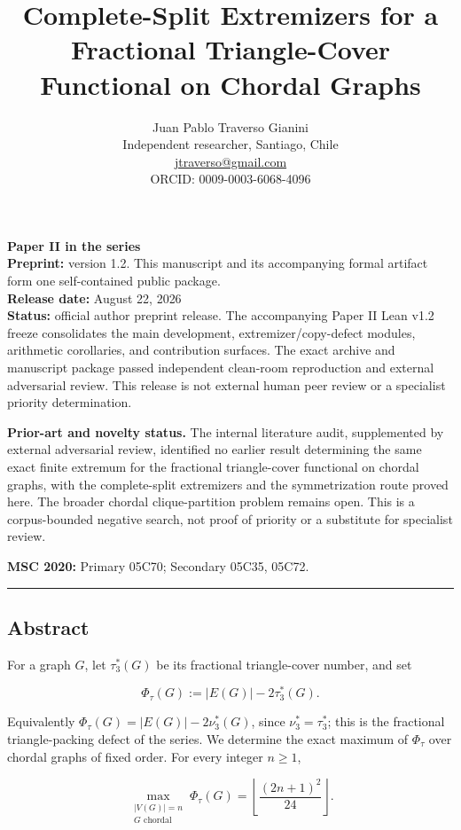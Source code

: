 \documentclass[
  american,
  11pt,
  a4paper,
]{article}
\title{Complete-Split Extremizers for a Fractional Triangle-Cover Functional on Chordal Graphs}
\author{Juan Pablo Traverso Gianini\\
\small Independent researcher, Santiago, Chile\\
\small \href{mailto:jtraverso@gmail.com}{jtraverso@gmail.com}\\
\small ORCID: 0009-0003-6068-4096}
\date{}
\begin{document}
\sloppy
\raggedbottom
\maketitle

\textbf{Paper II in the series}\\
\textbf{Preprint:} version 1.2. This manuscript and its accompanying formal artifact form one self-contained public package.\\
\textbf{Release date:} August 22, 2026\\
\textbf{Status:} official author preprint release. The accompanying Paper II Lean v1.2 freeze consolidates the main development, extremizer/copy-defect modules, arithmetic corollaries, and contribution surfaces. The exact archive and manuscript package passed independent clean-room reproduction and external adversarial review. This release is not external human peer review or a specialist priority determination.

\textbf{Prior-art and novelty status.} The internal literature audit, supplemented by external adversarial review, identified no earlier result determining the same exact finite extremum for the fractional triangle-cover functional on chordal graphs, with the complete-split extremizers and the symmetrization route proved here. The broader chordal clique-partition problem remains open. This is a corpus-bounded negative search, not proof of priority or a substitute for specialist review.

\textbf{MSC 2020:} Primary 05C70; Secondary 05C35, 05C72.

\begin{center}\rule{0.5\linewidth}{0.5pt}\end{center}

\subsection{Abstract}\label{abstract}

For a graph \(G\), let \(\tau_3^*(G)\) be its fractional triangle-cover number, and set

\[
\Phi_\tau(G):=|E(G)|-2\tau_3^*(G).
\]

Equivalently \(\Phi_\tau(G)=|E(G)|-2\nu_3^*(G)\), since \(\nu_3^*=\tau_3^*\); this is the fractional triangle-packing defect of the series. We determine the exact maximum of \(\Phi_\tau\) over chordal graphs of fixed order. For every integer \(n\ge1\),

\[
\boxed{
\max_{\substack{|V(G)|=n\\G\text{ chordal}}}
\Phi_\tau(G)
=
\left\lfloor\frac{(2n+1)^2}{24}\right\rfloor.
}
\]
\end{document}
